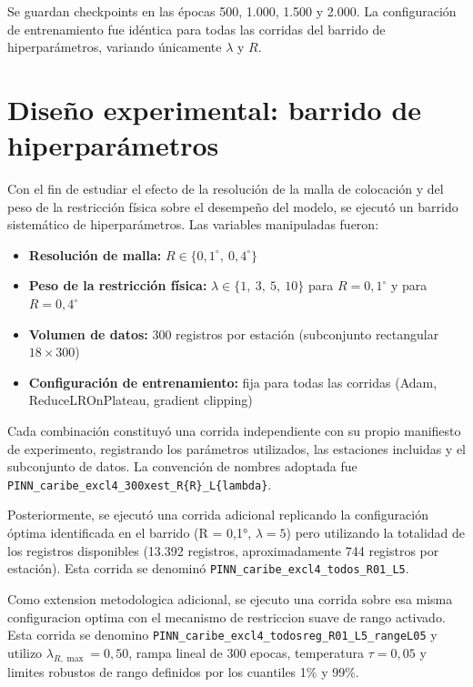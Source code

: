 Se guardan checkpoints en las épocas 500, 1.000, 1.500 y 2.000. La configuración de entrenamiento fue idéntica para todas las corridas del barrido de hiperparámetros, variando únicamente $\lambda$ y $R$.

\section{Diseño experimental: barrido de hiperparámetros}

Con el fin de estudiar el efecto de la resolución de la malla de colocación y del peso de la restricción física sobre el desempeño del modelo, se ejecutó un barrido sistemático de hiperparámetros. Las variables manipuladas fueron:

\begin{itemize}
	\item \textbf{Resolución de malla:} $R \in \{0{,}1^{\circ},\ 0{,}4^{\circ}\}$
	\item \textbf{Peso de la restricción física:} $\lambda \in \{1,\ 3,\ 5,\ 10\}$ para $R = 0{,}1^{\circ}$ y para $R = 0{,}4^{\circ}$
	\item \textbf{Volumen de datos:} 300 registros por estación (subconjunto rectangular $18 \times 300$)
	\item \textbf{Configuración de entrenamiento:} fija para todas las corridas (Adam, ReduceLROnPlateau, gradient clipping)
\end{itemize}

Cada combinación constituyó una corrida independiente con su propio manifiesto de experimento, registrando los parámetros utilizados, las estaciones incluidas y el subconjunto de datos. La convención de nombres adoptada fue \nolinkurl{PINN_caribe_excl4_300xest_R{R}_L{lambda}}.

Posteriormente, se ejecutó una corrida adicional replicando la configuración óptima identificada en el barrido (R = 0,1°, $\lambda = 5$) pero utilizando la totalidad de los registros disponibles (13.392 registros, aproximadamente 744 registros por estación). Esta corrida se denominó \nolinkurl{PINN_caribe_excl4_todos_R01_L5}.

Como extension metodologica adicional, se ejecuto una corrida sobre esa misma configuracion optima con el mecanismo de restriccion suave de rango activado. Esta corrida se denomino \nolinkurl{PINN_caribe_excl4_todosreg_R01_L5_rangeL05} y utilizo $\lambda_{R,\max}=0{,}50$, rampa lineal de 300 epocas, temperatura $\tau=0{,}05$ y limites robustos de rango definidos por los cuantiles 1\% y 99\%.

